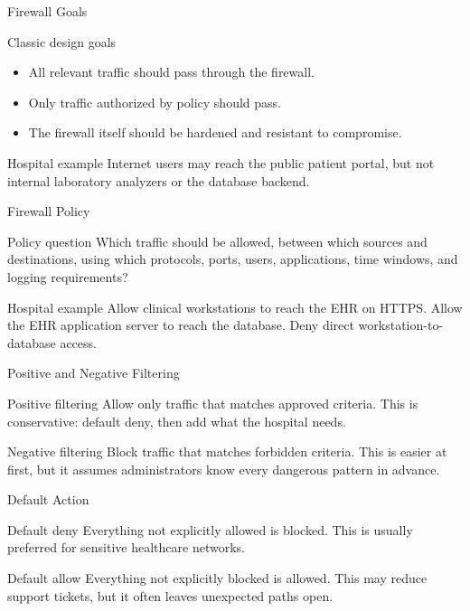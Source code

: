\documentclass[presentation]{beamer}
\begin{document}
\begin{frame}[c]{Firewall Goals}
\begin{block}{Classic design goals}
\begin{itemize}
    \item All relevant traffic should pass through the firewall.
    \item Only traffic authorized by policy should pass.
    \item The firewall itself should be hardened and resistant to compromise.
\end{itemize}
\end{block}

\begin{exampleblock}{Hospital example}
Internet users may reach the public patient portal, but not internal laboratory analyzers or the
database backend.
\end{exampleblock}
\end{frame}

\begin{frame}[c]{Firewall Policy}
\begin{block}{Policy question}
Which traffic should be allowed, between which sources and destinations, using which protocols,
ports, users, applications, time windows, and logging requirements?
\end{block}

\begin{exampleblock}{Hospital example}
Allow clinical workstations to reach the EHR on HTTPS. Allow the EHR application server to reach
the database. Deny direct workstation-to-database access.
\end{exampleblock}
\end{frame}

\begin{frame}[c]{Positive and Negative Filtering}
\begin{block}{Positive filtering}
Allow only traffic that matches approved criteria. This is conservative: default deny, then add what
the hospital needs.
\end{block}

\begin{block}{Negative filtering}
Block traffic that matches forbidden criteria. This is easier at first, but it assumes administrators
know every dangerous pattern in advance.
\end{block}
\end{frame}

\begin{frame}[c]{Default Action}
\begin{block}{Default deny}
Everything not explicitly allowed is blocked. This is usually preferred for sensitive healthcare
networks.
\end{block}

\begin{block}{Default allow}
Everything not explicitly blocked is allowed. This may reduce support tickets, but it often leaves
unexpected paths open.
\end{block}
\end{frame}
\end{document}
